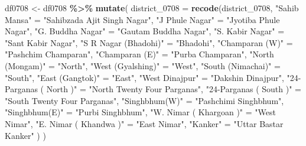 \documentclass[
]{article}
\newenvironment{Shaded}{\begin{snugshade}}{\end{snugshade}}
\newcommand{\AttributeTok}[1]{\textcolor[rgb]{0.13,0.29,0.53}{#1}}
\newcommand{\FunctionTok}[1]{\textcolor[rgb]{0.13,0.29,0.53}{\textbf{#1}}}
\newcommand{\NormalTok}[1]{#1}
\newcommand{\OtherTok}[1]{\textcolor[rgb]{0.56,0.35,0.01}{#1}}
\newcommand{\SpecialCharTok}[1]{\textcolor[rgb]{0.81,0.36,0.00}{\textbf{#1}}}
\newcommand{\StringTok}[1]{\textcolor[rgb]{0.31,0.60,0.02}{#1}}
\begin{document}
\begin{Shaded}
\begin{Highlighting}[]
\NormalTok{df0708 }\OtherTok{\textless{}{-}}\NormalTok{ df0708 }\SpecialCharTok{\%\textgreater{}\%}
  \FunctionTok{mutate}\NormalTok{(}
    \AttributeTok{district\_0708 =} \FunctionTok{recode}\NormalTok{(district\_0708,}
      \StringTok{"Sahib Mansa"} \OtherTok{=} \StringTok{"Sahibzada Ajit Singh Nagar"}\NormalTok{,}
      \StringTok{"J Phule Nagar"} \OtherTok{=} \StringTok{"Jyotiba Phule Nagar"}\NormalTok{,}
      \StringTok{"G. Buddha Nagar"} \OtherTok{=} \StringTok{"Gautam Buddha Nagar"}\NormalTok{,}
      \StringTok{"S. Kabir Nagar"} \OtherTok{=} \StringTok{"Sant Kabir Nagar"}\NormalTok{,}
      \StringTok{"S R Nagar (Bhadohi)"} \OtherTok{=} \StringTok{"Bhadohi"}\NormalTok{,}
      \StringTok{"Champaran (W)"} \OtherTok{=} \StringTok{"Pashchim Champaran"}\NormalTok{,}
      \StringTok{"Champaran (E)"} \OtherTok{=} \StringTok{"Purba Champaran"}\NormalTok{,}
      \StringTok{"North (Mongam)"} \OtherTok{=} \StringTok{"North"}\NormalTok{,}
      \StringTok{"West (Gyalshing)"} \OtherTok{=} \StringTok{"West"}\NormalTok{,}
      \StringTok{"South (Nimachai)"} \OtherTok{=} \StringTok{"South"}\NormalTok{,}
      \StringTok{"East (Gangtok)"} \OtherTok{=} \StringTok{"East"}\NormalTok{,}
      \StringTok{"West Dinajpur"} \OtherTok{=} \StringTok{"Dakshin Dinajpur"}\NormalTok{,}
      \StringTok{"24{-}Parganas ( North )"} \OtherTok{=} \StringTok{"North Twenty Four Parganas"}\NormalTok{,}
      \StringTok{"24{-}Parganas ( South )"} \OtherTok{=} \StringTok{"South Twenty Four Parganas"}\NormalTok{,}
      \StringTok{"Singhbhum(W)"} \OtherTok{=} \StringTok{"Pashchimi Singhbhum"}\NormalTok{,}
      \StringTok{"Singhbhum(E)"} \OtherTok{=} \StringTok{"Purbi Singhbhum"}\NormalTok{,}
      \StringTok{"W. Nimar ( Khargoan )"} \OtherTok{=} \StringTok{"West Nimar"}\NormalTok{,}
      \StringTok{"E. Nimar ( Khandwa )"} \OtherTok{=} \StringTok{"East Nimar"}\NormalTok{,}
      \StringTok{"Kanker"} \OtherTok{=} \StringTok{"Uttar Bastar Kanker"}
\NormalTok{      )}
\NormalTok{    )}



\end{Highlighting}
\end{Shaded}
\end{document}
